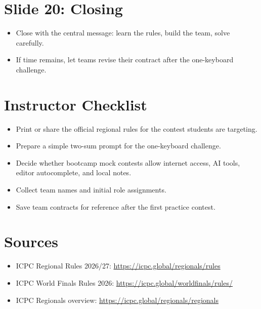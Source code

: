 \documentclass[11pt]{article}
\begin{document}
\section*{Slide 20: Closing}
\begin{itemize}
  \item Close with the central message: learn the rules, build the team, solve carefully.
  \item If time remains, let teams revise their contract after the one-keyboard challenge.
\end{itemize}

\section*{Instructor Checklist}
\begin{itemize}
  \item Print or share the official regional rules for the contest students are targeting.
  \item Prepare a simple two-sum prompt for the one-keyboard challenge.
  \item Decide whether bootcamp mock contests allow internet access, AI tools, editor autocomplete, and local notes.
  \item Collect team names and initial role assignments.
  \item Save team contracts for reference after the first practice contest.
\end{itemize}

\section*{Sources}
\begin{itemize}
  \item ICPC Regional Rules 2026/27: \url{https://icpc.global/regionals/rules}
  \item ICPC World Finals Rules 2026: \url{https://icpc.global/worldfinals/rules/}
  \item ICPC Regionals overview: \url{https://icpc.global/regionals/regionals}
\end{itemize}
\end{document}
